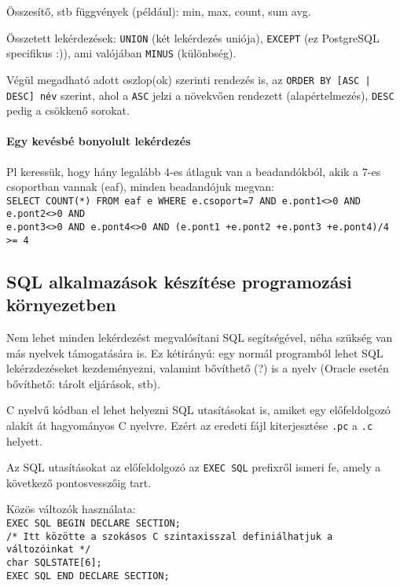\documentclass[fleqn,10pt,a4paper]{article}
\theoremstyle{magyar}
\begin{document}
  Összesítő, stb függvények (például): min, max, count, sum avg.
  
  Összetett lekérdezések: \texttt{UNION} (két lekérdezés uniója), \texttt{EXCEPT} (ez PostgreSQL specifikus :)), ami
  valójában \texttt{MINUS} (különbség).
  
  Végül megadható adott oszlop(ok) szerinti rendezés is, az \texttt{ORDER BY [ASC | DESC] név} szerint, ahol a
  \texttt{ASC} jelzi a növekvően rendezett (alapértelmezés), \texttt{DESC} pedig a csökkenő sorokat.
  
  \paragraph{Egy kevésbé bonyolult lekérdezés} Pl keressük, hogy hány legalább 4-es átlaguk van a beadandókból, akik a
  7-es csoportban vannak (eaf), minden beadandójuk megvan:\\
  \texttt{SELECT COUNT(*) FROM eaf e WHERE e.csoport=7 AND e.pont1<>0 AND e.pont2<>0 AND\\
    e.pont3<>0 AND e.pont4<>0 AND (e.pont1 +e.pont2 +e.pont3 +e.pont4)/4 >= 4}
  
  
  \subsection{SQL alkalmazások készítése programozási környezetben}
  Nem lehet minden lekérdezést megvalósítani SQL segítségével, néha szükség van más nyelvek támogatására is. Ez
  kétirányú: egy normál programból lehet SQL lekérzdezéseket kezdeményezni, valamint bővíthető (?) is a nyelv (Oracle
  esetén bővíthető: tárolt eljárások, stb).

  C nyelvű kódban el lehet helyezni SQL utasításokat is, amiket egy előfeldolgozó alakít át hagyományos C nyelvre. Ezért
  az eredeti fájl kiterjesztése \texttt{.pc} a \texttt{.c} helyett.

  Az SQL utasításokat az előfeldolgozó az \texttt{EXEC SQL} prefixről ismeri fe, amely a következő pontosvesszőig tart.
  
  Közös változók használata:\\
  \texttt{EXEC SQL BEGIN DECLARE SECTION;\\
    \hspace*{0.3cm} /* Itt közötte a szokásos C szintaxisszal definiálhatjuk a változóinkat */\\
    \hspace*{0.3cm} char SQLSTATE[6];\\
    EXEC SQL END DECLARE SECTION;}\\
  
\end{document}
